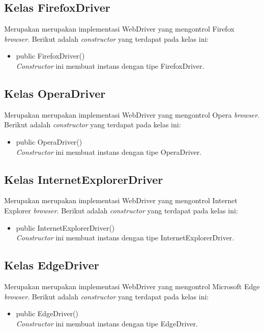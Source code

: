 \subsection{Kelas FirefoxDriver}
\label{subsec:firefoxdriver}
Merupakan merupakan implementasi WebDriver yang mengontrol Firefox \textit{browser}. Berikut adalah \textit{constructor} yang terdapat pada kelas ini:
\begin{itemize}
\item public FirefoxDriver()\\
\textit{Constructor} ini membuat instans dengan tipe FirefoxDriver.
\end{itemize}

\subsection{Kelas OperaDriver}
\label{subsec:operadriver}
Merupakan merupakan implementasi WebDriver yang mengontrol Opera \textit{browser}. Berikut adalah \textit{constructor} yang terdapat pada kelas ini:
\begin{itemize}
\item public OperaDriver()\\
\textit{Constructor} ini membuat instans dengan tipe OperaDriver.
\end{itemize}

\subsection{Kelas InternetExplorerDriver}
\label{subsec:internetexplorerdriver}
Merupakan merupakan implementasi WebDriver yang mengontrol Internet Explorer \textit{browser}. Berikut adalah \textit{constructor} yang terdapat pada kelas ini:
\begin{itemize}
\item public InternetExplorerDriver()\\
\textit{Constructor} ini membuat instans dengan tipe InternetExplorerDriver.
\end{itemize}

\subsection{Kelas EdgeDriver}
\label{subsec:edgedriver}
Merupakan merupakan implementasi WebDriver yang mengontrol Microsoft Edge \textit{browser}. Berikut adalah \textit{constructor} yang terdapat pada kelas ini:
\begin{itemize}
\item public EdgeDriver()\\
\textit{Constructor} ini membuat instans dengan tipe EdgeDriver.
\end{itemize}


